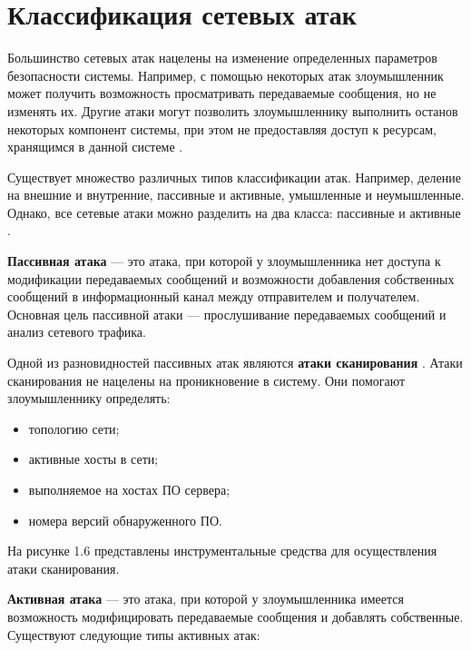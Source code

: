\section{Классификация сетевых атак}

Большинство сетевых атак нацелены на изменение определенных параметров безопасности системы. Например, с помощью некоторых атак злоумышленник может получить возможность просматривать передаваемые сообщения, но не изменять их. Другие атаки могут позволить злоумышленнику выполнить останов некоторых компонент системы, при этом не предоставляя доступ к ресурсам, хранящимся в данной системе \cite{third}.

Существует множество различных типов классификации атак. Например, деление на внешние и внутренние, пассивные и активные, умышленные и неумышленные.
Однако, все сетевые атаки можно разделить на два класса: пассивные и активные \cite{third}.

\textbf{Пассивная атака} \cite{fourth} --- это атака, при которой у злоумышленника нет доступа к модификации передаваемых сообщений и возможности добавления собственных сообщений в информационный канал между отправителем и получателем.
Основная цель пассивной атаки --- прослушивание передаваемых сообщений и анализ сетевого трафика.


Одной из разновидностей пассивных атак являются \textbf{атаки сканирования} \cite{fifth}. 
Атаки сканирования не нацелены на проникновение в систему. Они помогают злоумышленнику определять:

\begin{itemize}
    \item топологию сети;
    \item активные хосты в сети;
	\item выполняемое на хостах ПО сервера;
	\item номера версий обнаруженного ПО.
\end{itemize}

На рисунке 1.6 представлены инструментальные средства для осуществления атаки сканирования.




\textbf{Активная атака} \cite{six} --- это атака, при которой у злоумышленника имеется возможность модифицировать передаваемые сообщения и добавлять собственные. Существуют следующие типы активных атак:


